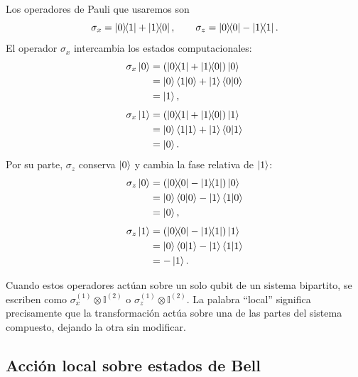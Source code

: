 \documentclass[12pt,a4paper]{article}
\theoremstyle{definition}
\theoremstyle{plain}
\theoremstyle{remark}
\newcommand{\I}{\mathbb{I}}
\begin{document}
Los operadores de Pauli que usaremos son
\begin{equation*}
    \sigma_x=\ketbra{0}{1}+\ketbra{1}{0},
    \qquad
    \sigma_z=\ketbra{0}{0}-\ketbra{1}{1}.
\end{equation*}
El operador $\sigma_x$ intercambia los estados computacionales:
\begin{align*}
    \sigma_x\ket{0}
    &=\left(\ketbra{0}{1}+\ketbra{1}{0}\right)\ket{0}\\
    &=\ket{0}\braket{1|0}+\ket{1}\braket{0|0}\\
    &=\ket{1},
\end{align*}
\begin{align*}
    \sigma_x\ket{1}
    &=\left(\ketbra{0}{1}+\ketbra{1}{0}\right)\ket{1}\\
    &=\ket{0}\braket{1|1}+\ket{1}\braket{0|1}\\
    &=\ket{0}.
\end{align*}
Por su parte, $\sigma_z$ conserva $\ket{0}$ y cambia la fase relativa de $\ket{1}$:
\begin{align*}
    \sigma_z\ket{0}
    &=\left(\ketbra{0}{0}-\ketbra{1}{1}\right)\ket{0}\\
    &=\ket{0}\braket{0|0}-\ket{1}\braket{1|0}\\
    &=\ket{0},
\end{align*}
\begin{align*}
    \sigma_z\ket{1}
    &=\left(\ketbra{0}{0}-\ketbra{1}{1}\right)\ket{1}\\
    &=\ket{0}\braket{0|1}-\ket{1}\braket{1|1}\\
    &=-\ket{1}.
\end{align*}

Cuando estos operadores actúan sobre un solo qubit de un sistema bipartito, se escriben como $\sigma_x^{(1)}\otimes\I^{(2)}$ o $\sigma_z^{(1)}\otimes\I^{(2)}$. La palabra ``local'' significa precisamente que la transformación actúa sobre una de las partes del sistema compuesto, dejando la otra sin modificar.

\subsection{Acción local sobre estados de Bell}
\end{document}
